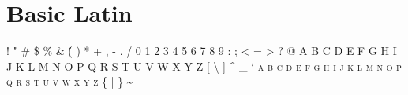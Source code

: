 

\presection\section*{\checkyes Basic Latin}\postsection

\textsc{! " \# \$ \% \& \' ( ) * + , - . / 0 1 2 3 4 5 6 7 8 9 : ; < = > ? @ 
A B C D E F G H I J K L M N O P Q R S T U V W X Y Z [ \textbackslash{} ] \^{} \_ ` 
a b c d e f g h i j k l m n o p q r s t u v w x y z \{ | \} \textasciitilde}